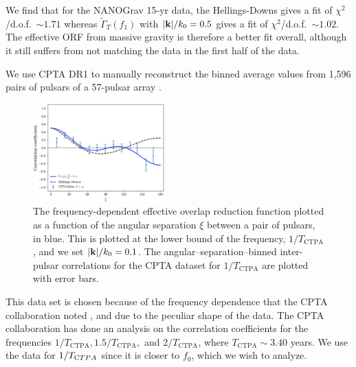 \documentclass[prd,twocolumn,aps,psfig,nofootinbib,nobibnotes,superscriptaddress,preprintnumbers,times]{revtex4-2}
\begin{document}
We find that for the NANOGrav 15-yr data, the Hellings-Downs gives a fit of $\chi^2$/d.o.f.\ $\sim 1.71$ whereas $\tilde{\Gamma}_T(f_1)$ with $|{\bf k}|/k_0 = 0.5$ gives a fit of $\chi^2$/d.o.f.\ $\sim 1.02$. The effective ORF from massive gravity is therefore a better fit overall, although it still suffers from not matching the data in the first half of the data.

We use CPTA DR1 to manually reconstruct the binned average values from 1,596 pairs of pulsars of a 57-pulsar array \cite{Xu:2023wog}. 
\begin{figure}[h]
    \centering
    \includegraphics[width=0.45\textwidth]{fig3.pdf}
    \caption{The frequency-dependent effective overlap reduction function plotted as a function of the angular separation $\xi$ between a pair of pulsars, in blue. This is plotted at the lower bound of the frequency, $1/T_{\text{CTPA}}$, and we set $|{\bf k}|/k_0 = 0.1$. The angular–separation–binned inter-pulsar correlations for the CPTA dataset for $1/T_{\text{CTPA}}$ are plotted with error bars.}
    \label{fig:cpta}
\end{figure}
This data set is chosen because of the frequency dependence that the CPTA collaboration noted \cite{Xu:2023wog}, and due to the peculiar shape of the data. The CPTA collaboration has done an analysis on the correlation coefficients for the frequencies $1/T_{\text{CTPA}}, 1.5/T_{\text{CTPA}},$ and $2/T_{\text{CTPA}}$, where $T_{\text{CTPA}} \sim 3.40$ years. We use the data for $1/T_{\text CTPA}$ since it is closer to $f_0$, which we wish to analyze. 
\end{document}
